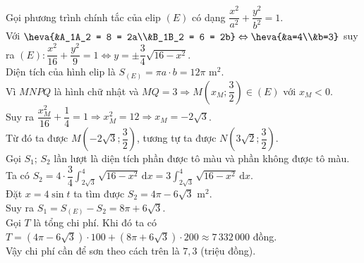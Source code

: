 \begin{bt}
{\begin{center}
		\end{center}
		Gọi phương trình chính tắc của elip $(E)$ có dạng  $\dfrac{x^2}{a^2}+\dfrac{y^2}{b^2} = 1$.\\
		Với $\heva{&A_1A_2 = 8 = 2a\\&B_1B_2  = 6 = 2b} \Leftrightarrow \heva{&a=4\\&b=3}$ suy ra $(E) \colon \dfrac{x^2}{16} + \dfrac{y^2}{9} = 1 \Leftrightarrow y = \pm \dfrac{3}{4}\sqrt{16 - x^2}$.\\
		Diện tích của hình elip là $S_{(E)} = \pi a \cdot b = 12\pi$ m$^2$.\\ 
		Vì $MNPQ$ là hình chữ nhật và $MQ =  3 \Rightarrow M \left(x_M; \dfrac{3}{2} \right) \in (E)$ với $x_M < 0$.\\
		Suy ra $\dfrac{x_M^2}{16} +  \dfrac{1}{4} = 1 \Rightarrow x_M^2 = 12 \Rightarrow x_M = -2\sqrt{3}$.\\
		Từ đó  ta được $M\left(-2\sqrt{3}; \dfrac{3}{2} \right)$, tương tự ta được $N\left(3\sqrt{2}; \dfrac{3}{2} \right)$.\\
		Gọi $S_1$; $S_2$ lần lượt là  diện tích phần được tô màu và phần không được tô màu.\\
		Ta có $S_2 = 4 \cdot \dfrac{3}{4}\displaystyle\int^{4}_{2\sqrt{3}} \sqrt{16 - x^2}\mathrm{\,d}x  = 3\displaystyle\int^{4}_{2\sqrt{3}} \sqrt{16 - x^2}\mathrm{\,d}x$.\\
		 Đặt $x = 4\sin{t}$ ta tìm được $S_2 = 4\pi - 6\sqrt{3}$ m$^2$.\\
		Suy ra $S_1 =  S_{(E)} - S_2 = 8\pi + 6\sqrt{3}$.\\
		Gọi $T$ là tổng chi phí.  Khi đó ta có
		$T = \left(4\pi - 6\sqrt{3} \right) \cdot 100 + \left(8\pi + 6\sqrt{3} \right)  \cdot 200 \approx 7\,332\,000$ đồng.\\
		 Vậy chi phí cần để sơn theo cách trên là $7{,}3$ (triệu đồng).
	 }
\end{bt}


